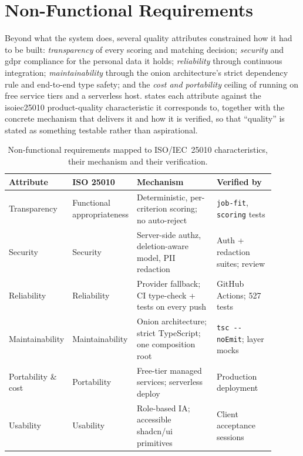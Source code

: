 
\section{Non-Functional Requirements}
\label{sec:analysis-nfr}

Beyond what the system does, several quality attributes constrained how it
had to be built: \emph{transparency} of every scoring and matching decision;
\emph{security} and \gls{gdpr} compliance for the personal data it holds;
\emph{reliability} through continuous integration; \emph{maintainability}
through the onion architecture's strict dependency rule and end-to-end type
safety; and the \emph{cost and portability} ceiling of running on free service
tiers and a serverless host.  states each attribute against the
\gls{isoiec25010} product-quality characteristic \parencite{ISO25010} it
corresponds to, together with the concrete mechanism that delivers it and how
it is verified, so that ``quality'' is stated as something testable rather than
aspirational.

\begin{table}[H]
\centering
\caption[Non-functional requirements]{Non-functional requirements mapped to
ISO/IEC~25010 characteristics, their mechanism and their verification.}
\label{tab:nfr}
\small
\begin{tabular}{p{0.18\linewidth}p{0.20\linewidth}p{0.30\linewidth}p{0.22\linewidth}}
\toprule
\textbf{Attribute} & \textbf{ISO 25010} & \textbf{Mechanism} & \textbf{Verified by} \\
\midrule
Transparency & Functional appropriateness & Deterministic, per-criterion scoring; no auto-reject & \texttt{job-fit}, \texttt{scoring} tests \\
Security & Security & Server-side authz, deletion-aware model, PII redaction & Auth + redaction suites; review \\
Reliability & Reliability & Provider fallback; CI type-check + tests on every push & GitHub Actions; 527 tests \\
Maintainability & Maintainability & Onion architecture; strict TypeScript; one composition root & \texttt{tsc -{}-noEmit}; layer mocks \\
Portability \& cost & Portability & Free-tier managed services; serverless deploy & Production deployment \\
Usability & Usability & Role-based IA; accessible shadcn/ui primitives & Client acceptance sessions \\
\bottomrule
\end{tabular}
\end{table}

